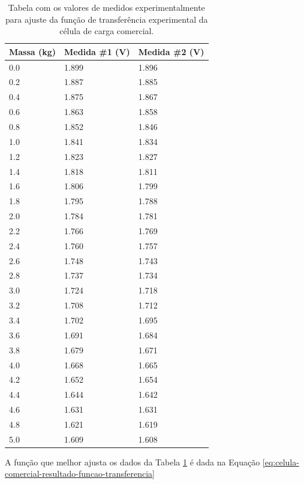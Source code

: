 \documentclass[a4paper]{instrumentacao}
\begin{document}
\begin{table}[H]
\centering
\caption{Tabela com os valores de medidos experimentalmente para ajuste da função de transferência experimental da célula de carga comercial.}
\begin{tabular}{|l|l|l|}

\hline
\textbf{Massa (kg)} & \textbf{Medida \#1 (V)} & \textbf{Medida \#2 (V)} \\ \hline
0.0 & 1.899 & 1.896 \\ \hline
0.2 & 1.887 & 1.885 \\ \hline
0.4 & 1.875 & 1.867 \\ \hline
0.6 & 1.863 & 1.858 \\ \hline
0.8 & 1.852 & 1.846 \\ \hline
1.0 & 1.841 & 1.834 \\ \hline
1.2 & 1.823 & 1.827 \\ \hline
1.4 & 1.818 & 1.811 \\ \hline
1.6 & 1.806 & 1.799 \\ \hline
1.8 & 1.795 & 1.788 \\ \hline
2.0 & 1.784 & 1.781 \\ \hline
2.2 & 1.766 & 1.769 \\ \hline
2.4 & 1.760 & 1.757 \\ \hline
2.6 & 1.748 & 1.743 \\ \hline
2.8 & 1.737 & 1.734 \\ \hline
3.0 & 1.724 & 1.718 \\ \hline
3.2 & 1.708 & 1.712 \\ \hline
3.4 & 1.702 & 1.695 \\ \hline
3.6 & 1.691 & 1.684 \\ \hline
3.8 & 1.679 & 1.671 \\ \hline
4.0 & 1.668 & 1.665 \\ \hline
4.2 & 1.652 & 1.654 \\ \hline
4.4 & 1.644 & 1.642 \\ \hline
4.6 & 1.631 & 1.631 \\ \hline
4.8 & 1.621 & 1.619 \\ \hline
5.0 & 1.609 & 1.608 \\ \hline

\end{tabular}
\label{tab:celula-comercial-resultado-funcao-transferencia}
\end{table}

A função que melhor ajusta os dados da Tabela \ref{tab:celula-comercial-resultado-funcao-transferencia} é dada na Equação \ref{eq:celula-comercial-resultado-funcao-transferencia}
\end{document}
